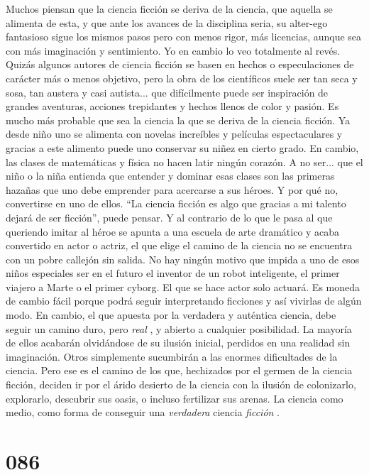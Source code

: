 \documentclass[a4paper,11pt,openright,twocolumn]{book}
\begin{document}
Muchos piensan que la ciencia ficción se deriva de la ciencia, que aquella se alimenta de esta, y que ante los avances
de la disciplina seria, su alter-ego fantasioso sigue los mismos pasos pero con menos rigor, más licencias, aunque
sea con más imaginación y sentimiento. Yo en cambio lo veo totalmente al revés. Quizás algunos autores de
ciencia ficción se basen en hechos o especulaciones de carácter más o menos objetivo, pero la obra de los
científicos suele ser tan seca y sosa, tan austera y casi autista... que difícilmente puede ser inspiración
de grandes aventuras, acciones trepidantes y hechos llenos de color y pasión. Es mucho más probable que sea
la ciencia la que se deriva de la ciencia ficción. Ya desde niño uno se alimenta con novelas increíbles
y películas espectaculares y gracias a este alimento puede uno conservar su niñez en cierto grado. En cambio,
las clases de matemáticas y física no hacen latir ningún corazón. A no ser... que el niño o la niña entienda
que entender y dominar esas clases son las primeras hazañas que uno debe emprender para acercarse a sus héroes.
Y por qué no, convertirse en uno de ellos. ``La ciencia ficción es algo que gracias a mi talento dejará
de ser ficción'', puede pensar. Y al contrario de lo que le pasa al que queriendo imitar al héroe se apunta a 
una escuela de arte dramático y acaba convertido en actor o actriz, el que elige el camino de la ciencia
no se encuentra con un pobre callejón sin salida. No hay ningún motivo que impida a uno de esos niños especiales
ser en el futuro el inventor de un robot inteligente, el primer viajero a Marte o el primer cyborg. El que se hace
actor solo actuará. Es moneda de cambio fácil porque podrá seguir interpretando ficciones y así vivirlas de 
algún modo. En cambio, el que apuesta por la verdadera y auténtica ciencia, debe seguir un camino duro, pero {\it real}  ,
y abierto a cualquier posibilidad. La mayoría de ellos acabarán olvidándose de su ilusión inicial, perdidos en una
realidad sin imaginación. Otros simplemente sucumbirán a las enormes dificultades de la ciencia. Pero ese es 
el camino de los que, hechizados por el germen de la ciencia ficción, deciden ir por el árido desierto de la
ciencia con la ilusión de colonizarlo, explorarlo, descubrir sus oasis, o incluso fertilizar sus arenas. La ciencia
como medio, como forma de conseguir una {\it verdadera}   ciencia {\it ficción}  . 


\section*{086}
\end{document}

